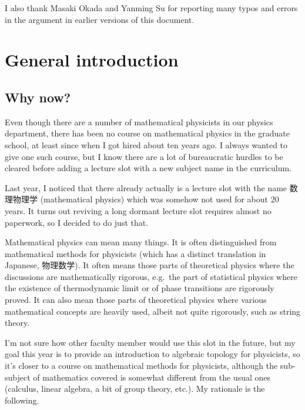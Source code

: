 \documentclass[12pt]{article}
\numberwithin{equation}{section}
\numberwithin{figure}{section}
\theoremstyle{remark}
\begin{document}
I also thank Masaki Okada and Yanming Su for reporting many typos and errors in the argument in earlier versions of this document.

\section{General introduction}

\subsection{Why now?}
\label{sec:whynow}

Even though there are a number of mathematical physicists in our physics department,
there has been no course on mathematical physics in the graduate school,
at least since when I got hired about ten years ago.
I always wanted to give one such course, but I know 
there are a lot of bureaucratic hurdles to be cleared before adding a lecture slot with a new subject name in the curriculum.

Last year, I noticed that there already actually is a lecture slot with the name
数理物理学 (mathematical physics)
which was somehow not used for about 20 years.
It turns out reviving a long dormant lecture slot requires almost no paperwork,
so I decided to do just that.

Mathematical physics can mean many things. 
It is often distinguished from mathematical methods for physicists (which has a distinct translation in Japanese, 物理数学).
It often means those parts of theoretical physics where the discussions are mathematically rigorous,
e.g.~the part of statistical physics where the existence of thermodynamic limit or of phase transitions are rigorously proved.
It can also mean those parts of theoretical physics where various mathematical concepts are heavily used, albeit not quite rigorously,
such as string theory.


I'm not sure how other faculty member would use this slot in the future,
but my goal this year is to provide an introduction to algebraic topology for physicists,
so it's closer to a course on mathematical methods for physicists,
although the sub-subject of mathematics covered is somewhat different from the usual ones (calculus, linear algebra, a bit of group theory, etc.).
My rationale is the following.
\end{document}
